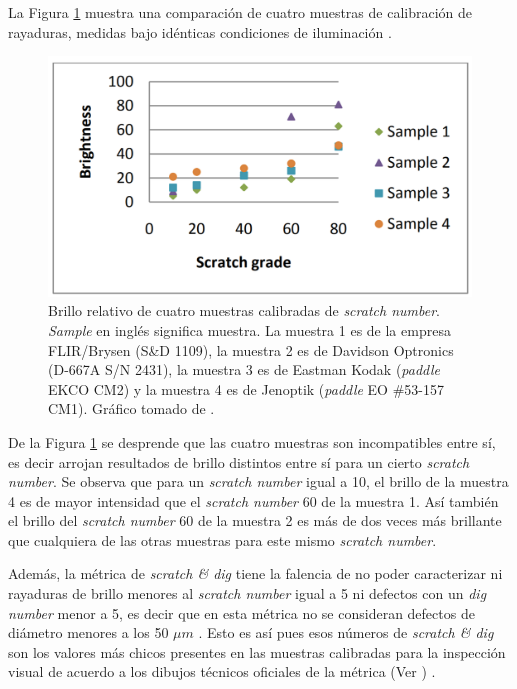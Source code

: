 La Figura \ref{fig:samplescratchs} muestra una comparación de cuatro muestras de calibración de rayaduras, medidas bajo idénticas condiciones de iluminación \cite{Aikens}.
\begin{figure}[H]
	\centering
	\includegraphics[scale=0.54]{Figs/cuantificaciondefectos/samplesscratch.png}
	\caption{Brillo relativo de cuatro muestras calibradas de \textit{scratch number}. \textit{Sample} en inglés significa muestra. La muestra 1 es de la empresa FLIR/Brysen (S\&D 1109), la muestra 2 es de Davidson Optronics (D-667A S/N 2431), la muestra 3 es de Eastman Kodak (\textit{paddle} EKCO CM2) y la muestra 4 es de Jenoptik (\textit{paddle} EO \#53-157 CM1). Gráfico tomado de \cite{Aikens}.}
	\label{fig:samplescratchs}
\end{figure}
De la Figura \ref{fig:samplescratchs} se desprende que las cuatro muestras son incompatibles entre sí, es decir arrojan resultados de brillo distintos entre sí para un cierto \textit{scratch number}. Se observa que para un \textit{scratch number} igual a 10, el brillo de la muestra 4 es de mayor intensidad que el \textit{scratch number} 60 de la muestra 1.
Así también el brillo del \textit{scratch number} 60 de la muestra 2 es más de dos veces más brillante que cualquiera de las otras muestras para este mismo \textit{scratch number}.

Además, la métrica de \textit{scratch \& dig} tiene la falencia de no poder caracterizar ni rayaduras de brillo menores al \textit{scratch number} igual a 5 ni defectos con un \textit{dig number} menor a 5, es decir que en esta métrica no se consideran defectos de diámetro menores a los 50 $\mu m$ \cite{quentin}. Esto es así pues esos números de \textit{scratch \& dig} son los valores más chicos presentes en las muestras calibradas para la inspección visual de acuerdo a los dibujos técnicos oficiales de la métrica (Ver \cite{dibujito})  .

